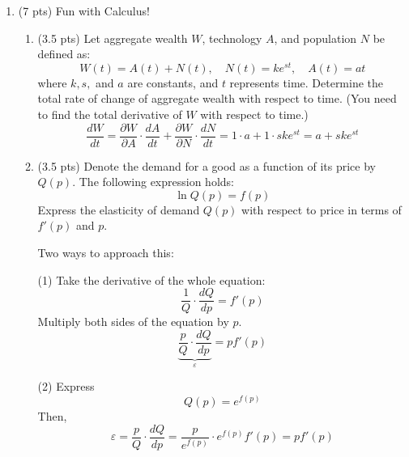 \documentclass{./../../Latex/tests}
\begin{document}
\begin{enumerate}
\newpage
\item (7 pts) Fun with Calculus!
\begin{enumerate}
\item (3.5 pts) Let aggregate wealth \( W \), technology $A$, and population \( N \) be defined as:
\[
W(t) = A(t) + N(t), \quad N(t) = k e^{st}, \quad A(t) = at
\]
where \(k, s,\) and \( a \) are constants, and \( t \) represents time. Determine the total rate of change of aggregate wealth with respect to time. (You need to find the total derivative of $W$ with respect to time.)
\[
\frac{dW}{dt} = \frac{\partial W}{ \partial A}\cdot \frac{dA}{dt} + \frac{\partial W}{\partial N} \cdot \frac{dN}{dt} = 1\cdot a + 1 \cdot sk e^{st} = a + sk e^{st}
\] \vspace{0.25em}
\item (3.5 pts) Denote the demand for a good as a function of its price by $Q(p)$. The following expression holds:
$$ \ln Q(p) =  f(p)  $$
Express the elasticity of demand $Q(p)$ with respect to price in terms of $f'(p)$ and $p$. 

Two ways to approach this:

(1) Take the derivative of the whole equation:
$$ \frac{1}{Q}\cdot \frac{dQ}{dp} = f'(p)$$
Multiply both sides of the equation by $p$. 
$$ \underbrace{\frac{p}{Q}\cdot \frac{dQ}{dp}}_{\varepsilon} = pf'(p)$$

(2) Express $$Q(p) = e^{f(p)}$$
Then,
$$ \varepsilon = \frac{p}{Q}\cdot \frac{dQ}{dp} = \frac{p}{e^{f(p)}}\cdot e^{f(p)} f'(p) = pf'(p) $$
\end{enumerate}
\end{enumerate}
\end{document}

